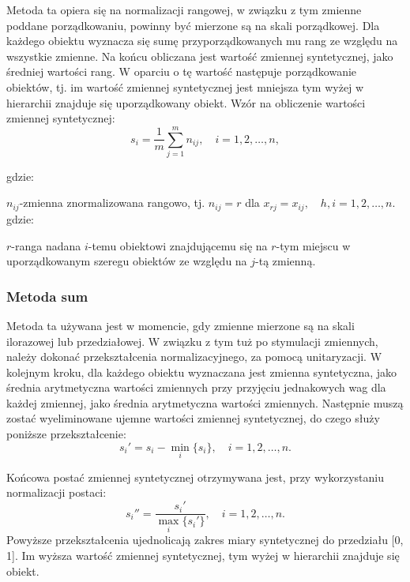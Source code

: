 \documentclass[12pt,a4paper]{report}
\begin{document}
Metoda ta opiera się na normalizacji rangowej, w związku z tym zmienne poddane porządkowaniu, powinny być mierzone są na skali porządkowej. Dla każdego obiektu wyznacza się sumę przyporządkowanych mu rang ze względu na wszystkie zmienne. Na końcu obliczana jest wartość zmiennej syntetycznej, jako średniej wartości rang. W oparciu o tę wartość następuje porządkowanie obiektów, tj. im wartość zmiennej syntetycznej jest mniejsza tym wyżej w hierarchii znajduje się uporządkowany obiekt. Wzór na obliczenie wartości zmiennej syntetycznej: 
$$
s_{i}=\frac{1}{m}\sum_{j=1}^{m} n_{ij},\quad i=1, 2, \ldots, n,
$$

gdzie:

$n_{ij}$-zmienna znormalizowana rangowo, tj.
$
n_{ij}=r$ dla $x_{rj}=x_{ij}, \quad h,i=1, 2, \ldots, n.
$
gdzie:

$r$-ranga nadana $i$-temu obiektowi znajdującemu się na $r$-tym miejscu w uporządkowanym szeregu obiektów ze względu na $j$-tą zmienną.


\subsubsection{Metoda sum}


Metoda ta używana jest w momencie, gdy zmienne mierzone są na skali ilorazowej lub przedziałowej. W związku z tym tuż po stymulacji zmiennych, należy dokonać przekształcenia normalizacyjnego, za pomocą unitaryzacji. W kolejnym kroku, dla każdego obiektu wyznaczana jest zmienna syntetyczna, jako średnia arytmetyczna wartości zmiennych przy przyjęciu jednakowych wag dla każdej zmiennej, jako średnia arytmetyczna wartości zmiennych.
Następnie muszą zostać wyeliminowane ujemne wartości zmiennej syntetycznej, do czego służy poniższe przekształcenie:
$$
s_{i}'=s_{i}-\min\limits_{i}\{s_i\}, \quad i=1, 2, \ldots, n.
$$

Końcowa postać zmiennej syntetycznej otrzymywana jest, przy wykorzystaniu normalizacji postaci: %
$$
s_{i}''=\frac{s_{i}'}{\max\limits_{i}\{s_{i}'\}},\quad i=1, 2, \ldots, n.
$$
Powyższe przekształcenia ujednolicają zakres miary syntetycznej do przedziału [0, 1]. Im wyższa wartość zmiennej syntetycznej, tym wyżej w hierarchii znajduje się obiekt.%
\end{document}
